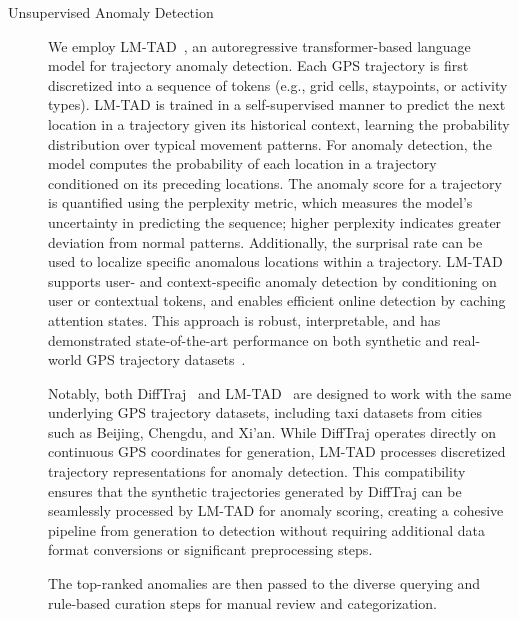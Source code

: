 \begin{description}
  \item[Unsupervised Anomaly Detection]
    We employ LM-TAD~\cite{mbuyaTrajectoryAnomalyDetection2024}, an autoregressive transformer-based language model for trajectory anomaly detection. Each GPS trajectory is first discretized into a sequence of tokens (e.g., grid cells, staypoints, or activity types). LM-TAD is trained in a self-supervised manner to predict the next location in a trajectory given its historical context, learning the probability distribution over typical movement patterns. For anomaly detection, the model computes the probability of each location in a trajectory conditioned on its preceding locations. The anomaly score for a trajectory is quantified using the perplexity metric, which measures the model's uncertainty in predicting the sequence; higher perplexity indicates greater deviation from normal patterns. Additionally, the surprisal rate can be used to localize specific anomalous locations within a trajectory. LM-TAD supports user- and context-specific anomaly detection by conditioning on user or contextual tokens, and enables efficient online detection by caching attention states. This approach is robust, interpretable, and has demonstrated state-of-the-art performance on both synthetic and real-world GPS trajectory datasets~\cite{mbuyaTrajectoryAnomalyDetection2024}.

    Notably, both DiffTraj~\cite{zhuDiffTrajGeneratingGPS2023} and LM-TAD~\cite{mbuyaTrajectoryAnomalyDetection2024} are designed to work with the same underlying GPS trajectory datasets, including taxi datasets from cities such as Beijing, Chengdu, and Xi'an. While DiffTraj operates directly on continuous GPS coordinates for generation, LM-TAD processes discretized trajectory representations for anomaly detection. This compatibility ensures that the synthetic trajectories generated by DiffTraj can be seamlessly processed by LM-TAD for anomaly scoring, creating a cohesive pipeline from generation to detection without requiring additional data format conversions or significant preprocessing steps.

    The top-ranked anomalies are then passed to the diverse querying and rule-based curation steps for manual review and categorization.


\end{description}
